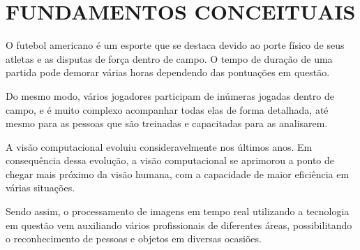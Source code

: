 \chapter{FUNDAMENTOS CONCEITUAIS}

O futebol americano é um esporte que se destaca devido ao porte físico de seus atletas e as disputas de força dentro de campo. O tempo de duração de uma partida pode demorar várias horas dependendo das pontuações em questão.

Do mesmo modo, vários jogadores participam de inúmeras jogadas dentro de campo, e é muito complexo acompanhar todas elas de forma detalhada, até mesmo para as pessoas que são treinadas e capacitadas para as analisarem.

A visão computacional evoluiu consideravelmente nos últimos anos. Em consequência dessa evolução, a visão computacional se aprimorou a ponto de chegar mais próximo da visão humana, com a capacidade de maior eficiência em várias situações.

Sendo assim, o processamento de imagens em tempo real utilizando a tecnologia em questão vem auxiliando vários profissionais de diferentes áreas, possibilitando o reconhecimento de pessoas e objetos em diversas ocasiões.















%
%